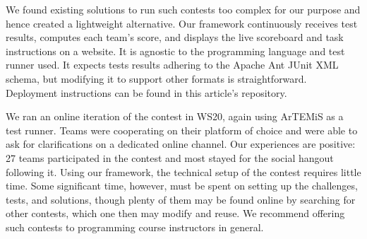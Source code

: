 We found existing solutions
to run such contests too complex for our purpose
and hence created a lightweight alternative.
Our framework continuously receives test results,
computes each team's score,
and displays the live scoreboard and task instructions on a website.
It is agnostic to the programming language and test runner used.
It expects tests results adhering to the Apache Ant JUnit XML schema,
but modifying it to support other formats is straightforward.
Deployment instructions can be found in this article's repository.

We ran an online iteration of the contest in WS20,
again using ArTEMiS as a test runner.
Teams were cooperating on their platform of choice
and were able to ask for clarifications on a dedicated online channel.
Our experiences are positive:
27 teams participated in the contest
and most stayed for the social hangout following it.
Using our framework,
the technical setup of the contest requires little time.
Some significant time, however,
must be spent on setting up the challenges,
tests, and solutions,
though plenty of them may be found
online by searching for other contests,
which one then may modify and reuse.
We recommend offering such contests
to programming course instructors in general.



